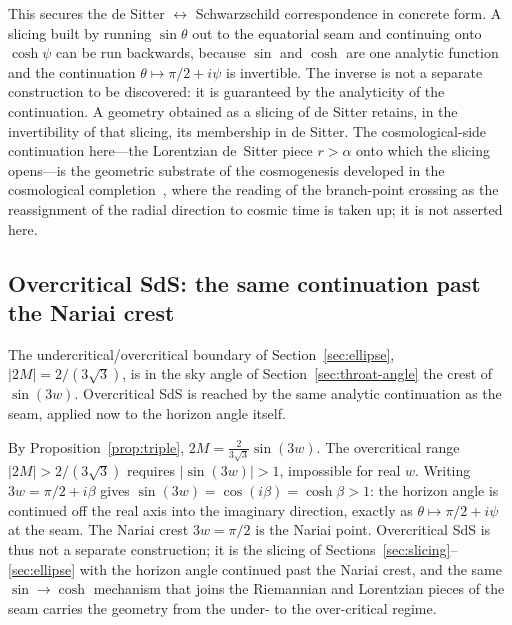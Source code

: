 \documentclass[11pt,a4paper]{article}
\theoremstyle{definition}
\begin{document}
This secures the de Sitter $\leftrightarrow$ Schwarzschild correspondence in concrete form. A slicing built by running $\sin\theta$ out to the equatorial seam and continuing onto $\cosh\psi$ can be run backwards, because $\sin$ and $\cosh$ are one analytic function and the continuation $\theta\mapsto\pi/2+i\psi$ is invertible. The inverse is not a separate construction to be discovered: it is guaranteed by the analyticity of the continuation. A geometry obtained as a slicing of de Sitter retains, in the invertibility of that slicing, its membership in de Sitter. The cosmological-side continuation here---the Lorentzian de~Sitter piece $r>\alpha$ onto which the slicing opens---is the geometric substrate of the cosmogenesis developed in the cosmological completion~\cite{JanzenCRframework}, where the reading of the branch-point crossing as the reassignment of the radial direction to cosmic time is taken up; it is not asserted here.

\subsection{Overcritical SdS: the same continuation past the Nariai crest}\label{sec:overcritical}

The undercritical/overcritical boundary of Section~\ref{sec:ellipse}, $|2M|=2/(3\sqrt{3})$, is in the sky angle of Section~\ref{sec:throat-angle} the crest of $\sin(3w)$. Overcritical SdS is reached by the same analytic continuation as the seam, applied now to the horizon angle itself.

By Proposition~\ref{prop:triple}, $2M=\tfrac{2}{3\sqrt3}\sin(3w)$. The overcritical range $|2M|>2/(3\sqrt3)$ requires $|\sin(3w)|>1$, impossible for real $w$. Writing $3w=\pi/2+i\beta$ gives $\sin(3w)=\cos(i\beta)=\cosh\beta>1$: the horizon angle is continued off the real axis into the imaginary direction, exactly as $\theta\mapsto\pi/2+i\psi$ at the seam. The Nariai crest $3w=\pi/2$ is the Nariai point. Overcritical SdS is thus not a separate construction; it is the slicing of Sections~\ref{sec:slicing}--\ref{sec:ellipse} with the horizon angle continued past the Nariai crest, and the same $\sin\to\cosh$ mechanism that joins the Riemannian and Lorentzian pieces of the seam carries the geometry from the under- to the over-critical regime.
\end{document}
